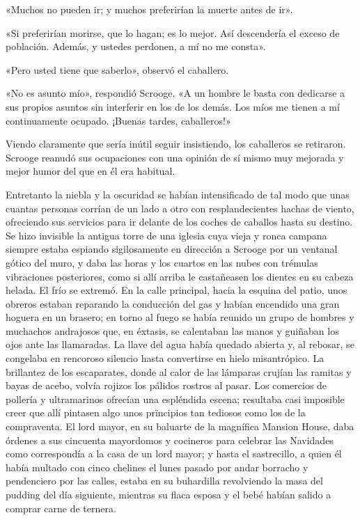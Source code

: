 \documentclass{novela}
\begin{document}
 «Muchos no pueden ir; y muchos preferirían la muerte antes de ir».

 «Si preferirían morirse, que lo hagan; es lo mejor. Así descendería el exceso de población. Además, y ustedes perdonen, a mí no me consta».

 «Pero usted tiene que saberlo», observó el caballero.

 «No es asunto mío», respondió Scrooge. «A un hombre le basta con dedicarse a sus propios asuntos sin interferir en los de los demás. Los míos me tienen a mí continuamente ocupado. ¡Buenas tardes, caballeros!»

 Viendo claramente que sería inútil seguir insistiendo, los caballeros se retiraron. Scrooge reanudó sus ocupaciones con una opinión de sí mismo muy mejorada y mejor humor del que en él era habitual.

 Entretanto la niebla y la oscuridad se habían intensificado de tal modo que unas cuantas personas corrían de un lado a otro con resplandecientes hachas de viento, ofreciendo sus servicios para ir delante de los coches de caballos hasta su destino. Se hizo invisible la antigua torre de una iglesia cuya vieja y ronca campana siempre estaba espiando sigilosamente en dirección a Scrooge por un ventanal gótico del muro, y daba las horas y los cuartos en las nubes con trémulas vibraciones posteriores, como si allí arriba le castañeasen los dientes en su cabeza helada. El frío se extremó. En la calle principal, hacia la esquina del patio, unos obreros estaban reparando la conducción del gas y habían encendido una gran hoguera en un brasero; en torno al fuego se había reunido un grupo de hombres y muchachos andrajosos que, en éxtasis, se calentaban las manos y guiñaban los ojos ante las llamaradas. La llave del agua había quedado abierta y, al rebosar, se congelaba en rencoroso silencio hasta convertirse en hielo misantrópico. La brillantez de los escaparates, donde al calor de las lámparas crujían las ramitas y bayas de acebo, volvía rojizos los pálidos rostros al pasar. Los comercios de pollería y ultramarinos ofrecían una espléndida escena; resultaba casi imposible creer que allí pintasen algo unos prïncipios tan tediosos como los de la compraventa. El lord mayor, en su baluarte de la magnífica Mansion House, daba órdenes a sus cincuenta mayordomos y cocineros para celebrar las Navidades como correspondía a la casa de un lord mayor; y hasta el sastrecillo, a quien él había multado con cinco chelines el lunes pasado por andar borracho y pendenciero por las calles, estaba en su buhardilla revolviendo la masa del pudding del día siguiente, mientras su flaca esposa y el bebé habían salido a comprar carne de ternera.
\end{document}
